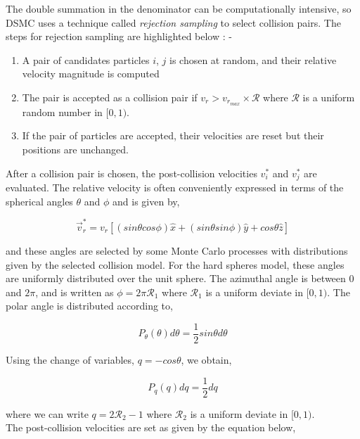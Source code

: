 \no The double summation in the denominator can be computationally intensive, so DSMC uses a technique called \textit{rejection sampling} to select collision pairs. The steps for rejection sampling are highlighted below : -

\begin{enumerate}
	\item A pair of candidates particles $i$, $j$ is chosen at random, and their relative velocity magnitude is computed
	\item The pair is accepted as a collision pair if $v_r > v_{r_{max}} \times \mathcal{R}$ where $\mathcal{R}$ is a uniform random number in $[0,1)$.
	\item If the pair of particles are accepted, their velocities are reset but their positions are unchanged.
\end{enumerate}

\no After a collision pair is chosen, the post-collision velocities $v_i^\ast$ and $v_j^\ast$ are evaluated. The relative velocity is often conveniently expressed in terms of the spherical angles $\theta$ and $\phi$ and is given by,

\begin{equation}
	\vec{v}^\ast_r = v_r \left[ (sin\theta cos\phi) \hat{x} + (sin\theta sin\phi) \hat{y} + cos\theta \hat{z} \right]
\end{equation}

\no and these angles are selected by some Monte Carlo processes with distributions given by the selected collision model. For the hard spheres model, these angles are uniformly distributed over the unit sphere. The azimuthal angle is between $0$ and $2\pi$, and is written as $ \phi = 2\pi \mathcal{R}_1 $ where $\mathcal{R}_1$ is a uniform deviate in $[0,1)$. The polar angle is distributed according to,

\begin{equation}
	P_\theta (\theta) d\theta = \frac{1}{2} sin\theta d\theta
\end{equation}

\no Using the change of variables, $q = - cos\theta$, we obtain,

\begin{equation}
	P_q(q)dq = \frac{1}{2}dq
\end{equation}

\no where we can write $ q = 2 \mathcal{R}_2 - 1 $ where $ \mathcal{R}_2 $ is a uniform deviate in $ [0,1) $. \\

\no The post-collision velocities are set as given by the equation below,

